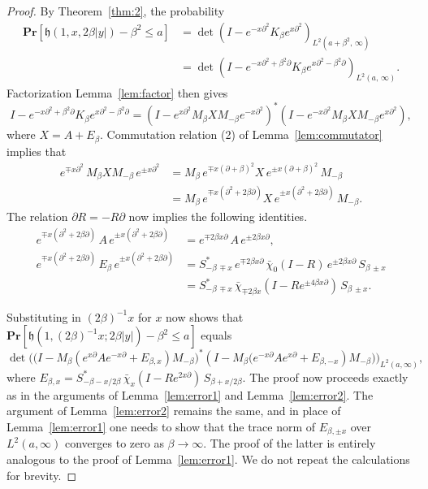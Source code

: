 \documentclass[AHL,Unicode,longabstracts]{cedram}
\newcommand{\pr}[1]{\mathbf{Pr}\left[#1\right]}
\newcommand{\h}{\mathfrak{h}}
\begin{document}
\begin{proof}
By Theorem~\ref{thm:2}, the probability
\begin{align*}
\pr{\h(1,x, 2\beta|y|) - \beta^2 \leq a} &=
\det \left (I - e^{- x \partial^2} K_{\beta} e^{x \partial^2} \right)_{L^2(a+\beta^2,\,\infty)}\\
& = \det \left (I - e^{- x \partial^2+\beta^2 \partial} K_{\beta} e^{x \partial^2 -\beta^2 \partial} \right)_{L^2(a,\, \infty)}.
\end{align*}
Factorization Lemma~\ref{lem:factor} then gives
\[
I - e^{- x \partial^2+\beta^2 \partial} K_{\beta} e^{x \partial^2 -\beta^2 \partial} =
\left (I - e^{x \partial^2} M_{\beta} X M_{-\beta} e^{-x\partial^2} \right)^*
\left (I - e^{-x \partial^2} M_{\beta} X M_{-\beta} e^{x\partial^2} \right),
\]
where $X = A + E_{\beta}$. Commutation relation (2) of Lemma~\ref{lem:commutator} implies that
\begin{align*}
e^{\mp x \partial^2} \, M_{\beta} X M_{- \beta} \, e^{\pm x\partial^2} &= M_{\beta} \, e^{\mp x (\partial+\beta)^2} X \, e^{\pm x(\partial+\beta)^2} \, M_{-\beta} \\
& = M_{\beta} \, e^{\mp x(\partial^2 + 2\beta \partial)} X \, e^{\pm x(\partial^2+ 2 \beta \partial)} \, M_{-\beta}.
\end{align*}
The relation $\partial R = - R \partial$ now implies the following identities.
\begin{align*}
e^{\mp x(\partial^2+2 \beta \partial)} \, A \, e^{\pm x(\partial^2 +2\beta \partial)} &= e^{\mp 2\beta x \partial} \, A \, e^{\pm 2\beta x \partial},\\
e^{\mp x(\partial^2+2 \beta \partial)} \, E_{\beta} \, e^{\pm x(\partial^2 +2\beta \partial)} & = S^{*}_{- \beta \, \mp x} \, e^{\mp 2\beta x \partial} \, \bar{\chi}_0 (I-R) \, e^{\pm 2\beta x \partial} \, S_{\beta \, \pm x} \\
&= S^{*}_{- \beta \, \mp x} \, \bar{\chi}_{\mp 2\beta x}(I - Re^{\pm 4\beta x \partial}) \, S_{\beta \, \pm x}.
\end{align*}

Substituting in $(2\beta)^{-1}x $ for $x$ now shows that $\pr{\h(1,(2 \beta)^{-1}x; 2\beta|y|) - \beta^2 \leq a}$ equals
\[
\det \Big (\big(I - M_{\beta} (e^{x \partial}Ae^{-x\partial} + E_{\beta,x}) M_{-\beta} \big)^{*}
(I - M_{\beta} \big (e^{-x \partial}Ae^{x\partial} + E_{\beta,-x}) M_{-\beta} \big) \Big)_{L^2(a,\infty)},
\]
where $E_{\beta,x} = S^{*}_{-\beta - x/2\beta} \, \bar{\chi}_{x}(I-Re^{2x \partial}) \, S_{\beta + x/2\beta}$. The proof now proceeds exactly as in the arguments of Lemma~\ref{lem:error1} and Lemma~\ref{lem:error2}. The argument of Lemma~\ref{lem:error2} remains the same, and in place of Lemma~\ref{lem:error1} one needs to show that the trace norm of $E_{\beta,\pm x}$ over $L^2(a,\infty)$ converges to zero as $\beta \to \infty$. The proof of the latter is entirely analogous to the proof of Lemma~\ref{lem:error1}. We do not repeat the calculations for brevity.


\end{proof}
\end{document}
